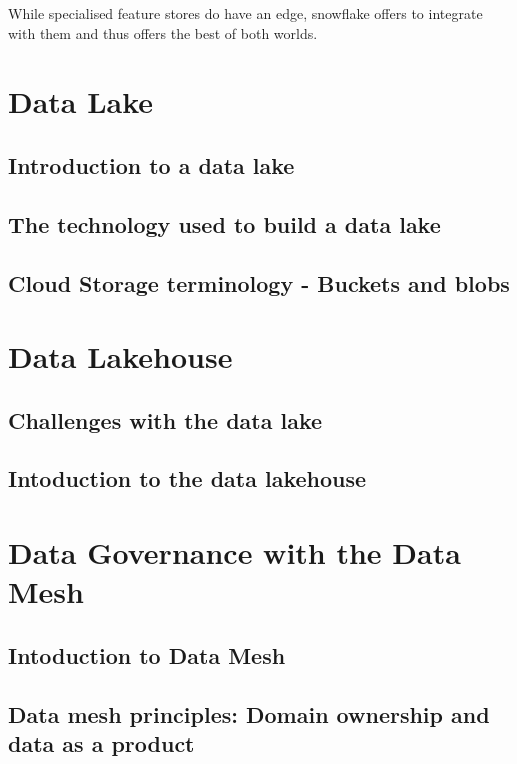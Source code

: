 \documentclass[11pt]{article}
\begin{document}
    While specialised feature stores do have an edge, snowflake offers to integrate with them and thus offers the best of both worlds.



    \section{Data Lake}

    \subsection{Introduction to a data lake}
    
    \subsection{The technology used to build a data lake}
    
    \subsection{Cloud Storage terminology - Buckets and blobs}
    
    \section{Data Lakehouse}
    
    \subsection{Challenges with the data lake}
    
    \subsection{Intoduction to the data lakehouse}

    \section{Data Governance with the Data Mesh}
    
    \subsection{Intoduction to Data Mesh}

    \subsection{Data mesh principles: Domain ownership and data as a product}
\end{document}
